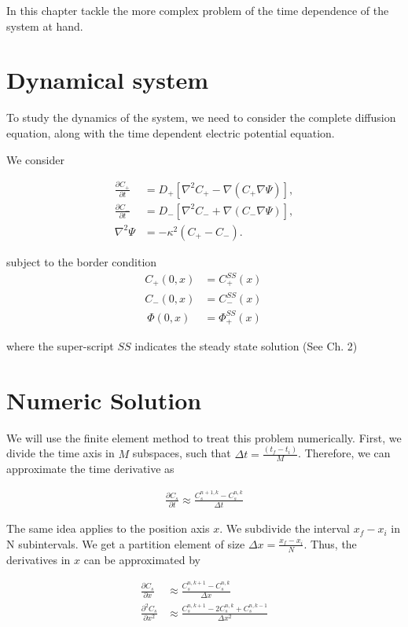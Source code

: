 In this chapter tackle  the more complex problem of the time dependence of the system at hand.

\section*{Dynamical system}

To study the dynamics of the system, we need to consider the complete diffusion equation, along with the time dependent electric potential equation.

We consider

\begin{align}
\frac{\partial C_+}{\partial t} &= D_+ \left[\nabla^2 C_+ -  \nabla (C_+ \nabla \Psi) \right] , \\
\frac{\partial C_-}{\partial t} &= D_- \left[\nabla^2 C_- + \nabla (C_- \nabla \Psi) \right], \\
\nabla^2 \Psi &= -\kappa^2 \left(C_+ - C_- \right).
\label{eq:dynamic-system}
\end{align}

subject to the border condition 
\begin{align}
C_+(0, x) & = C^{SS}_+(x)\\
C_-(0, x) & =  C^{SS}_-(x)\\\
\Phi(0, x) &= \Phi^{SS}_+(x)\
\end{align}

where the super-script $SS$ indicates the steady state solution (See Ch. 2)%

\section*{Numeric Solution}

We will use the finite element method to treat this problem numerically. First, we divide the time axis in $M$ subspaces, such that $\Delta t = \frac{(t_f- t_i)}{M}$. Therefore, we can approximate the time derivative as

\begin{align}
\frac{\partial C_s}{\partial t} \approx \frac{C^{n+1, k}_s - C^{n, k}_s}{\Delta t}
\end{align}

The same idea applies to the position axis $x$. We subdivide the interval $x_f - x_i$ in N subintervals. We get a partition element of size $\Delta x = \frac{x_f - x_i}{N}$. Thus, the derivatives in $x$ can be approximated by

\begin{align}
\frac{\partial C_s}{\partial x} &\approx \frac{C^{n, k+1}_s - C^{n, k}_s}{\Delta x}\\
\frac{\partial^2 C_s}{\partial x^2} &\approx \frac{C^{n, k + 1}_s - 2C^{n, k}_s + C^{n, k-1}_s}{\Delta x^2}
\end{align}

